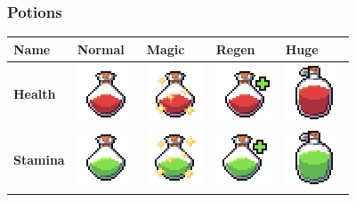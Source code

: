 \documentclass[../Main.tex]{subfiles}
\begin{document}
        \subsubsection{Potions}
            \begin{center}
                \begin{tabular}{ | m{} | m{} | m{} |  m{} | m{} | }
                    \hline
                    \textbf{Name} & \textbf{Normal} & \textbf{Magic} & \textbf{Regen} & \textbf{Huge} \\
                    \hline
                    \textbf{Health} & \centerline{\includegraphics{../res/textures/items/potions/bottles/Red.png}} & \centerline{\includegraphics{../res/textures/items/potions/bottles/RedMagic.png}} & \centerline{\includegraphics{../res/textures/items/potions/bottles/RedRegen.png}} & \centerline{\includegraphics{../res/textures/items/potions/bottles/RedHuge.png}} \\
                    \hline
                    \textbf{Stamina} & \centerline{\includegraphics{../res/textures/items/potions/bottles/Green.png}} & \centerline{\includegraphics{../res/textures/items/potions/bottles/GreenMagic.png}} & \centerline{\includegraphics{../res/textures/items/potions/bottles/GreenRegen.png}} & \centerline{\includegraphics{../res/textures/items/potions/bottles/GreenHuge.png}} \\

\end{tabular}
\end{center}
\end{document}
